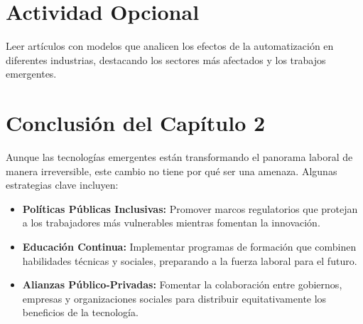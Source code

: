 \begin{refsection}
\section{Actividad Opcional}

Leer artículos con modelos que analicen los efectos de la automatización en diferentes industrias, destacando los sectores más afectados y los trabajos emergentes.



\section{Conclusión del Capítulo 2}
Aunque las tecnologías emergentes están transformando el panorama laboral de manera irreversible, este cambio no tiene por qué ser una amenaza. Algunas estrategias clave incluyen:
\begin{itemize}
    \item \textbf{Políticas Públicas Inclusivas:} Promover marcos regulatorios que protejan a los trabajadores más vulnerables mientras fomentan la innovación.
    \item \textbf{Educación Continua:} Implementar programas de formación que combinen habilidades técnicas y sociales, preparando a la fuerza laboral para el futuro.
    \item \textbf{Alianzas Público-Privadas:} Fomentar la colaboración entre gobiernos, empresas y organizaciones sociales para distribuir equitativamente los beneficios de la tecnología.
\end{itemize}




\nocite{*}

\printbibliography[heading=subbibliography, title={Bibliografía del Capítulo 2}]
\end{refsection}
